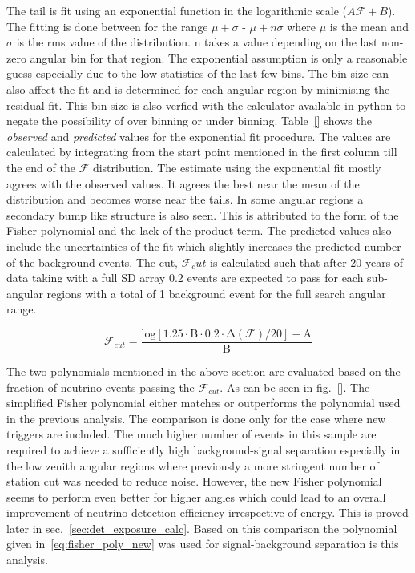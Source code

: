 The tail is fit using an exponential function in the logarithmic scale ($A \mathcal{F} + B$). The fitting is done between for the range $\mu + \sigma$ - $\mu + n\sigma$ where $\mu$ is the mean and $\sigma$ is the rms value of the distribution. n takes a value depending on the last non-zero angular bin for that region. The exponential assumption is only a reasonable guess especially due to the low statistics of the last few bins. The bin size can also affect the fit and is determined for each angular region by minimising the residual fit. This bin size is also verfied with the calculator available in python to negate the possibility of over binning or under binning. Table~\ref{} shows the \textit{observed} and \textit{predicted} values for the exponential fit procedure. The values are calculated by integrating from the start point mentioned in the first column till the end of the $\mathcal{F}$ distribution. The estimate using the exponential fit mostly agrees with the observed values. It agrees the best near the mean of the distribution and becomes worse near the tails. In some angular regions a secondary bump like structure is also seen. This is attributed to the form of the Fisher polynomial and the lack of the product term. The predicted values also include the uncertainties of the fit which slightly increases the predicted number of the background events. The cut, $\mathcal{F}_cut$ is calculated such that after 20 years of data taking with a full SD array 0.2 events are expected to pass for each sub-angular regions with a total of 1 background event for the full search angular range. 

\begin{equation}
  \mathcal{F}_{cut} = \mathrm{\frac{log[1.25 \cdot B \cdot 0.2 \cdot \Delta (\mathcal{F}) / 20] - A}{B} }
\end{equation}

The two polynomials mentioned in the above section are evaluated based on the fraction of neutrino events passing the $\mathcal{F}_{cut}$. As can be seen in fig.~\ref{}. The simplified Fisher polynomial either matches or outperforms the polynomial used in the previous analysis. The comparison is done only for the case where new triggers are included. The much higher number of events in this sample are required to achieve a sufficiently high background-signal separation especially in the low zenith angular regions where previously a more stringent number of station cut was needed to reduce noise. However, the new Fisher polynomial seems to perform even better for higher angles which could lead to an overall improvement of neutrino detection efficiency irrespective of energy. This is proved later in sec.~\ref{sec:det_exposure_calc}. Based on this comparison the polynomial given in~\ref{eq:fisher_poly_new} was used for signal-background separation is this analysis. 


